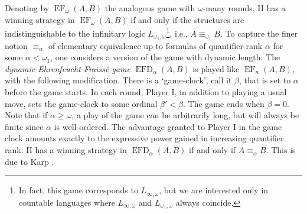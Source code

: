 \documentclass[12pt]{amsart}
\DeclareMathOperator{\EFD}{EFD}
\DeclareMathOperator{\EF}{EF}
\begin{document}
Denoting by $\EF_\omega(A,B)$ the analogous game with $\omega$-many rounds, II has a winning strategy in $\EF_\omega(A,B)$ if and only if the structures are indistinguishable to the infinitary logic $L_{\omega_1, \omega}$\footnote{In fact, this game corresponds to $L_{\infty,\omega}$, but we are interested only in countable languages where $L_{\infty,\omega}$ and $L_{\omega_1,\omega}$ always coincide.}, i.e., $A\equiv_{\omega_1}B$. To capture the finer notion $\equiv_\alpha$ of elementary equivalence up to formulas of quantifier-rank $\alpha$ for some $\alpha<\omega_1$, one considers a version of the game with dynamic length. The \textit{dynamic Ehrenfeucht-Fra\"iss\'e game} $\EFD_\alpha(A,B)$ is played like $\EF_n(A,B)$, with the following modification. There is a `game-clock', call it $\beta$, that is set to $\alpha$ before the game starts. In each round, Player I, in addition to playing a usual move, sets the game-clock to some ordinal $\beta'<\beta$. The game ends when $\beta=0$. Note that if $\alpha\geq\omega$, a play of the game can be arbitrarily long, but will always be finite since $\alpha$ is well-ordered. The advantage granted to Player I in the game clock amounts exactly to the expressive power gained in increasing quantifier rank: II has a winning strategy in $\EFD_\alpha(A,B)$ if and only if $A\equiv_\alpha B$. This is due to Karp \cite{KARP2014407}.\\
\end{document}
